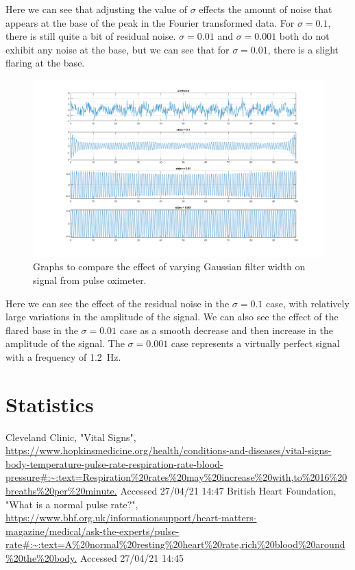\documentclass[11pt]{article}
\numberwithin{equation}{section}
\begin{document}
Here we can see that adjusting the value of $\sigma$ effects the amount of noise that appears at the base of the peak in the Fourier transformed data. For $\sigma = 0.1$, there is still quite a bit of residual noise. $\sigma = 0.01$ and $\sigma = 0.001$ both do not exhibit any noise at the base, but we can see that for $\sigma = 0.01$, there is a slight flaring at the base.
\begin{figure}[H]
    \centering
    \includegraphics[width = \textwidth]{./img/q306b.png}
    \caption{Graphs to compare the effect of varying Gaussian filter width on signal from pulse oximeter.}
    \label{fig:q306b}
\end{figure}
Here we can see the effect of the residual noise in the $\sigma = 0.1$ case, with relatively large variations in the amplitude of the signal. We can also see the effect of the flared base in the $\sigma = 0.01$ case as a smooth decrease and then increase in the amplitude of the signal. The $\sigma = 0.001$ case represents a virtually perfect signal with a frequency of \SI{1.2}{\hertz}.
\section{Statistics}
\begin{thebibliography}{00}
     Cleveland Clinic, "Vital Signs", \url{https://www.hopkinsmedicine.org/health/conditions-and-diseases/vital-signs-body-temperature-pulse-rate-respiration-rate-blood-pressure#:~:text=Respiration%20rates%20may%20increase%20with,to%2016%20breaths%20per%20minute.} Accessed 27/04/21 14:47
     British Heart Foundation, "What is a normal pulse rate?", \url{https://www.bhf.org.uk/informationsupport/heart-matters-magazine/medical/ask-the-experts/pulse-rate#:~:text=A%20normal%20resting%20heart%20rate,rich%20blood%20around%20the%20body.} Accessed 27/04/21 14:45
\end{thebibliography}
\end{document}
